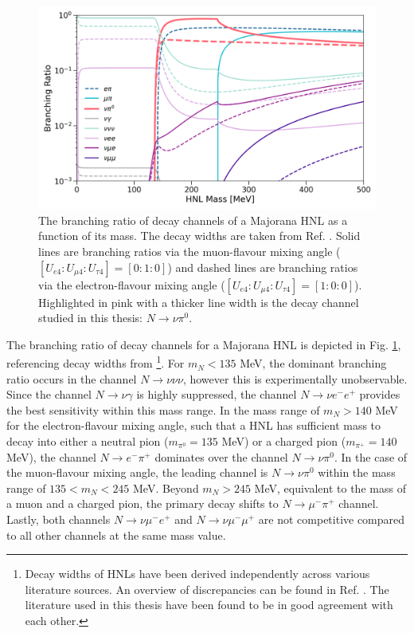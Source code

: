 \begin{figure}[t] 
\centering    
\includegraphics[width=1.0\textwidth]{branching_ratio}
\caption[branchingRatio]
{
The branching ratio of decay channels of a Majorana HNL as a function of its mass.
The decay widths are taken from Ref. \cite{HNLBin, SBNHNL, HNLZarko}.
Solid lines are branching ratios via the muon-flavour mixing angle ($[U_{e4}:U_{\mu4}:U_{\tau4}]=[0:1:0]$) and dashed lines are branching ratios via the electron-flavour mixing angle ($[U_{e4}:U_{\mu4}:U_{\tau4}]=[1:0:0]$).
Highlighted in pink with a thicker line width is the decay channel studied in this thesis: $N\rightarrow \nu \pi^{0}.$
}
\label{fig:branchingRatio}
\end{figure}

The branching ratio of decay channels for a Majorana HNL is depicted in Fig. \ref{fig:branchingRatio}, referencing decay widths from \cite {HNLBin, SBNHNL, HNLZarko}\footnote{Decay widths of HNLs have been derived independently across various literature sources. An overview of discrepancies can be found in Ref. \cite{HNLZarko}. The literature used in this thesis have been found to be in good agreement with each other.}.
For $m_{N} < 135$ MeV, the dominant branching ratio occurs in the channel $N\rightarrow \nu\nu\nu$, however this is experimentally unobservable.
Since the channel $N\rightarrow \nu \gamma$ is highly suppressed, the channel $N\rightarrow \nu e^{-}e^{+}$ provides the best sensitivity within this mass range.
In the mass range of $m_{N} > 140$ MeV for the electron-flavour mixing angle, such that a HNL has sufficient mass to decay into either a neutral pion ($m_{\pi^{0}}=135$ MeV) or a charged pion ($m_{\pi^{+}}=140$ MeV), the channel $N\rightarrow e^{-}\pi^{+}$ dominates over the channel $N\rightarrow \nu \pi^{0}$.
In the case of the muon-flavour mixing angle, the leading channel is $N\rightarrow \nu \pi^{0}$ within the mass range of $135 < m_{N} < 245 $ MeV.
Beyond $m_{N} > 245$ MeV, equivalent to the mass of a muon and a charged pion, the primary decay shifts to $N\rightarrow \mu^{-}\pi^{+}$ channel. 
Lastly, both channels $N\rightarrow \nu \mu^{-}e^{+}$ and $N\rightarrow \nu \mu^{-}\mu^{+}$ are not competitive compared to all other channels at the same mass value.  

